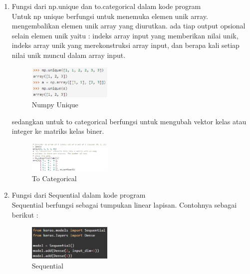 \begin{enumerate}
\item Fungsi dari np.unique dan to.categorical dalam kode program\\
Untuk np unique berfungsi untuk menemuka elemen unik array. mengembalikan elemen unik array yang diurutkan. ada tiap output opsional selain elemen unik yaitu : indeks array input yang memberikan nilai unik, indeks array unik yang merekonstruksi array input, dan berapa kali setiap nilai unik muncul dalam array input.
\hfill\break
	\begin{figure}[H]
		\includegraphics[width=4cm]{figures/1174054/6/7.png}
		\centering
		\caption{Numpy Unique}
	\end{figure}
sedangkan untuk to categorical berfungsi untuk mengubah vektor kelas atau integer ke matriks kelas biner.
\hfill\break
	\begin{figure}[H]
		\includegraphics[width=4cm]{figures/1174054/6/8.png}
		\centering
		\caption{To Categorical}
	\end{figure}

\item Fungsi dari Sequential dalam kode program\\
Sequential berfungsi sebagai tumpukan linear lapisan. Contohnya sebagai berikut :
\hfill\break
	\begin{figure}[H]
		\includegraphics[width=4cm]{figures/1174054/6/9.png}
		\centering
		\caption{Sequential}
	\end{figure}

\end{enumerate}

